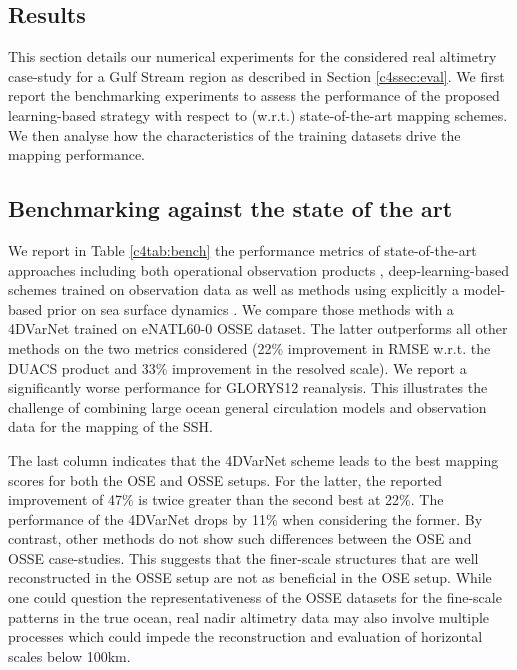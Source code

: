 \begin{bibunit}
\section{Results}
\label{c4sec:results}

This section details our numerical experiments for the considered real altimetry case-study for a Gulf Stream region as described in Section \ref{c4ssec:eval}. We first report the benchmarking experiments to assess the performance of the proposed learning-based strategy with respect to (w.r.t.) state-of-the-art mapping schemes. We then analyse how the characteristics of the training datasets drive the mapping performance. 





\subsection*{Benchmarking against the state of the art}
\label{c4ssec:benchmarks}

We report in Table \ref{c4tab:bench} the performance metrics of state-of-the-art approaches including both operational observation products \cite{taburetDUACSDT2018252019,ubelmannReconstructingOceanSurface2021}, deep-learning-based schemes trained on observation data \cite{archambaultMultimodalUnsupervisedSpatioTemporal2023,martinSynthesizingSeaSurface2023} as well as methods using explicitly a model-based prior on sea surface dynamics \cite{guillouMappingAltimetryForthcoming2021,ballarottaDynamicMappingAlongTrack2020,jean-michelCopernicusGlobal122021}. We compare those methods with a 4DVarNet trained on eNATL60-0 OSSE dataset. The latter outperforms all other methods on the two metrics considered (22\% improvement in RMSE w.r.t. the DUACS product and 33\% improvement in the resolved scale). We report a significantly worse performance for GLORYS12 reanalysis. This illustrates the challenge of combining large ocean general circulation models and observation data for the mapping of the SSH.


The last column indicates that the 4DVarNet scheme leads to the best mapping scores for both the OSE and OSSE setups. For the latter, the reported improvement of 47\% is twice greater than the second best at 22\%. The performance of the 4DVarNet drops by 11\% when considering the former. By contrast, other methods do not show such differences between the OSE and OSSE case-studies. This suggests that the finer-scale structures that are well reconstructed in the OSSE setup are not as beneficial in the OSE setup. While one could question the representativeness of the OSSE datasets for the fine-scale patterns in the true ocean, real nadir altimetry data may also involve multiple processes which could impede the reconstruction and evaluation of horizontal scales below 100km.  




\end{bibunit}
